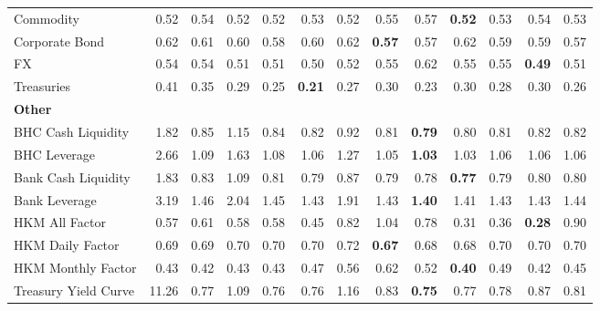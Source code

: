 \begin{tabular}{@{}lrrrrrrrrrrrr@{}}
Commodity & 0.52 & 0.54 & 0.52 & 0.52 & 0.53 & 0.52 & 0.55 & 0.57 & \textbf{0.52} & 0.53 & 0.54 & 0.53 \\
Corporate Bond & 0.62 & 0.61 & 0.60 & 0.58 & 0.60 & 0.62 & \textbf{0.57} & 0.57 & 0.62 & 0.59 & 0.59 & 0.57 \\
FX & 0.54 & 0.54 & 0.51 & 0.51 & 0.50 & 0.52 & 0.55 & 0.62 & 0.55 & 0.55 & \textbf{0.49} & 0.51 \\
Treasuries & 0.41 & 0.35 & 0.29 & 0.25 & \textbf{0.21} & 0.27 & 0.30 & 0.23 & 0.30 & 0.28 & 0.30 & 0.26 \\
\midrule
\multicolumn{13}{l}{\textbf{Other}} \\
BHC Cash Liquidity & 1.82 & 0.85 & 1.15 & 0.84 & 0.82 & 0.92 & 0.81 & \textbf{0.79} & 0.80 & 0.81 & 0.82 & 0.82 \\
BHC Leverage & 2.66 & 1.09 & 1.63 & 1.08 & 1.06 & 1.27 & 1.05 & \textbf{1.03} & 1.03 & 1.06 & 1.06 & 1.06 \\
Bank Cash Liquidity & 1.83 & 0.83 & 1.09 & 0.81 & 0.79 & 0.87 & 0.79 & 0.78 & \textbf{0.77} & 0.79 & 0.80 & 0.80 \\
Bank Leverage & 3.19 & 1.46 & 2.04 & 1.45 & 1.43 & 1.91 & 1.43 & \textbf{1.40} & 1.41 & 1.43 & 1.43 & 1.44 \\
HKM All Factor & 0.57 & 0.61 & 0.58 & 0.58 & 0.45 & 0.82 & 1.04 & 0.78 & 0.31 & 0.36 & \textbf{0.28} & 0.90 \\
HKM Daily Factor & 0.69 & 0.69 & 0.70 & 0.70 & 0.70 & 0.72 & \textbf{0.67} & 0.68 & 0.68 & 0.70 & 0.70 & 0.70 \\
HKM Monthly Factor & 0.43 & 0.42 & 0.43 & 0.43 & 0.47 & 0.56 & 0.62 & 0.52 & \textbf{0.40} & 0.49 & 0.42 & 0.45 \\
Treasury Yield Curve & 11.26 & 0.77 & 1.09 & 0.76 & 0.76 & 1.16 & 0.83 & \textbf{0.75} & 0.77 & 0.78 & 0.87 & 0.81 \\
\bottomrule
\end{tabular}
